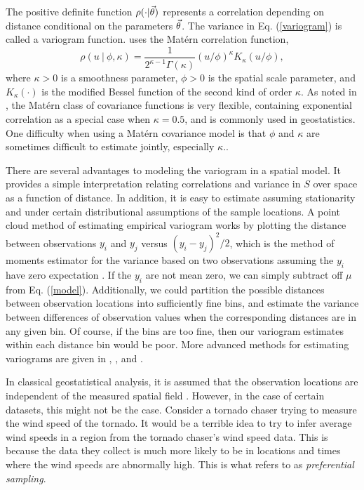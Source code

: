 \documentclass{uwstat572}
\begin{document}
The positive definite function $\rho(\cdot  \vert \vec{\theta})$ represents a correlation depending on distance conditional on the parameters $\vec{\theta}$.  The variance in Eq. (\ref{variogram}) is called a variogram function.  \citet{diggle2010} uses the Mat\'{e}rn correlation function,
$$ \rho(u \ \vert \ \phi, \kappa) = \frac{1}{2^{\kappa - 1} \Gamma(\kappa)} (u/\phi)^{\kappa} K_\kappa(u/\phi), $$
where $\kappa > 0$ is a smoothness parameter, $\phi > 0$ is the spatial scale parameter, and $K_\kappa(\cdot)$ is the modified Bessel function of the second kind of order $\kappa$.  As noted in \citet{diggle2010}, the Mat\'{e}rn class of covariance functions is very flexible, containing exponential correlation as a special case when $\kappa = 0.5$, and is commonly used in geostatistics.  One difficulty when using a Mat\'{e}rn covariance model is that $\phi$ and $\kappa$ are sometimes difficult to estimate jointly, especially $\kappa$.\citep{diggle2010}.
\par
There are several advantages to modeling the variogram in a spatial model.  It provides a simple interpretation relating correlations and variance in $S$ over space as a function of distance.  In addition, it is easy to estimate assuming stationarity and under certain distributional assumptions of the sample locations.  A point cloud method of estimating empirical variogram works by plotting the distance between observations $y_i$ and $y_j$ versus $(y_i - y_j)^2/2$, which is the method of moments estimator for the variance based on two observations assuming the $y_i$ have zero expectation \citep{diggle2010}.  If the $y_i$ are not mean zero, we can simply subtract off $\mu$ from Eq. (\ref{model}).  Additionally, we could partition the possible distances between observation locations into sufficiently fine bins, and estimate the variance between differences of observation values when the corresponding distances are in any given bin.  Of course, if the bins are too fine, then our variogram estimates within each distance bin would be poor.  More advanced methods for estimating variograms are given in \citet[section 2.2]{chiles1999}, \citet{cressie1985}, and \citet[section 2.4]{cressie1991}.
\par
In classical geostatistical analysis, it is assumed that the observation locations are independent of the measured spatial field \citep{diggle2010}.  However, in the case of certain datasets, this might not be the case.  Consider a tornado chaser trying to measure the wind speed of the tornado.  It would be a terrible idea to try to infer average wind speeds in a region from the tornado chaser's wind speed data.  This is because the data they collect is much more likely to be in locations and times where the wind speeds are abnormally high.  This is what \citet{diggle2010} refers to as \emph{preferential sampling}.
\end{document}
